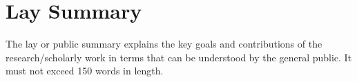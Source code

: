 

\chapter{Lay Summary}

The lay or public summary explains the key goals and contributions of
the research\slash{}scholarly work in terms that can be understood by the
general public. It must not exceed 150 words in length.
